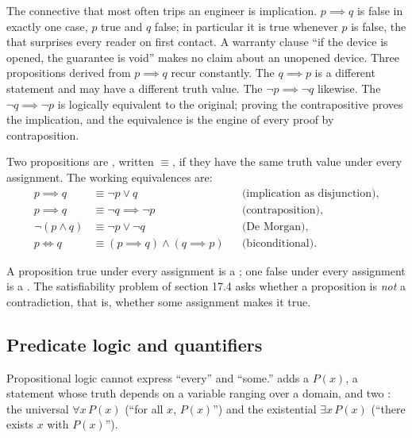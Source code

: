 The connective that most often trips an engineer is implication.
$p \implies q$ is false in exactly one case, $p$ true and $q$
false; in particular it is true whenever $p$ is false, the
 that surprises every reader on first
contact. A warranty clause ``if the device is opened, the guarantee
is void'' makes no claim about an unopened device. Three
propositions derived from $p \implies q$ recur constantly. The
 $q \implies p$ is a different statement and may
have a different truth value. The  $\lnot p
\implies \lnot q$ likewise. The  $\lnot q
\implies \lnot p$ is logically equivalent to the original; proving
the contrapositive proves the implication, and the equivalence is
the engine of every proof by contraposition.

\begin{principle}
Two propositions are , written $\equiv$,
if they have the same truth value under every assignment. The
working equivalences are:
\begin{align*}
p \implies q &\equiv \lnot p \lor q
  &&\text{(implication as disjunction)},\\
p \implies q &\equiv \lnot q \implies \lnot p
  &&\text{(contraposition)},\\
\lnot(p \land q) &\equiv \lnot p \lor \lnot q
  &&\text{(De Morgan)},\\
p \iff q &\equiv (p \implies q) \land (q \implies p)
  &&\text{(biconditional)}.
\end{align*}
\end{principle}

A proposition true under every assignment is a ;
one false under every assignment is a . The
satisfiability problem of section 17.4 asks whether a proposition is
\emph{not} a contradiction, that is, whether some assignment makes
it true.

\subsection{Predicate logic and quantifiers}

Propositional logic cannot express ``every'' and ``some.''
 adds a  $P(x)$, a
statement whose truth depends on a variable ranging over a domain,
and two : the universal $\forall x\, P(x)$
(``for all $x$, $P(x)$'') and the existential $\exists x\, P(x)$
(``there exists $x$ with $P(x)$'').

